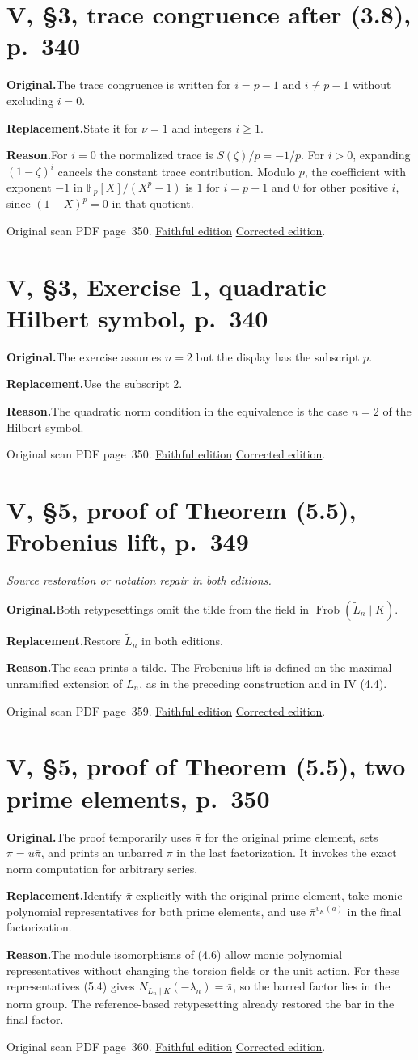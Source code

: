 \documentclass[11pt,a4paper]{article}
\newcommand{\original}{\par\smallskip\noindent\textbf{Original.}\enspace}
\newcommand{\replacement}{\par\smallskip\noindent\textbf{Replacement.}\enspace}
\newcommand{\reason}{\par\smallskip\noindent\textbf{Reason.}\enspace}
\newcommand{\editionlink}[3]{\href{#1\#errata.#2}{#3}}
\newcommand{\location}[2]{%
  \par\smallskip\noindent Original scan PDF page~#2.\enspace
  \editionlink{Neukirch_Faithful.pdf}{#1}{Faithful edition}
  \quad\editionlink{Neukirch_Corrected.pdf}{#1}{Corrected edition}.}
\begin{document}
\setcounter{section}{118}
\section{V, \S3, trace congruence after (3.8), p.~340}\label{errata:item:119}

\original The trace congruence is written for $i=p-1$ and $i\ne p-1$ without excluding $i=0$.
\replacement State it for $\nu=1$ and integers $i\ge1$.
\reason For $i=0$ the normalized trace is $S(\zeta)/p=-1/p$. For $i>0$, expanding $(1-\zeta)^i$ cancels the constant trace contribution. Modulo $p$, the coefficient with exponent $-1$ in $\mathbb F_p[X]/(X^p-1)$ is $1$ for $i=p-1$ and $0$ for other positive $i$, since $(1-X)^p=0$ in that quotient.
\location{119}{350}

\setcounter{section}{119}
\section{V, \S3, Exercise 1, quadratic Hilbert symbol, p.~340}\label{errata:item:120}

\original The exercise assumes $n=2$ but the display has the subscript $p$.
\replacement Use the subscript $2$.
\reason The quadratic norm condition in the equivalence is the case $n=2$ of the Hilbert symbol.
\location{120}{350}

\setcounter{section}{120}
\section{V, \S5, proof of Theorem (5.5), Frobenius lift, p.~349}\label{errata:item:121}
\noindent\emph{Source restoration or notation repair in both editions.}\par
\original Both retypesettings omit the tilde from the field in $\operatorname{Frob}(\widetilde L_n\mid K)$.
\replacement Restore $\widetilde L_n$ in both editions.
\reason The scan prints a tilde. The Frobenius lift is defined on the maximal unramified extension of $L_n$, as in the preceding construction and in IV (4.4).
\location{121}{359}

\setcounter{section}{121}
\section{V, \S5, proof of Theorem (5.5), two prime elements, p.~350}\label{errata:item:122}

\original The proof temporarily uses $\bar\pi$ for the original prime element, sets $\pi=u\bar\pi$, and prints an unbarred $\pi$ in the last factorization. It invokes the exact norm computation for arbitrary series.
\replacement Identify $\bar\pi$ explicitly with the original prime element, take monic polynomial representatives for both prime elements, and use $\bar\pi^{v_K(a)}$ in the final factorization.
\reason The module isomorphisms of (4.6) allow monic polynomial representatives without changing the torsion fields or the unit action. For these representatives (5.4) gives $N_{L_n\mid K}(-\lambda_n)=\bar\pi$, so the barred factor lies in the norm group. The reference-based retypesetting already restored the bar in the final factor.
\location{122}{360}
\end{document}
